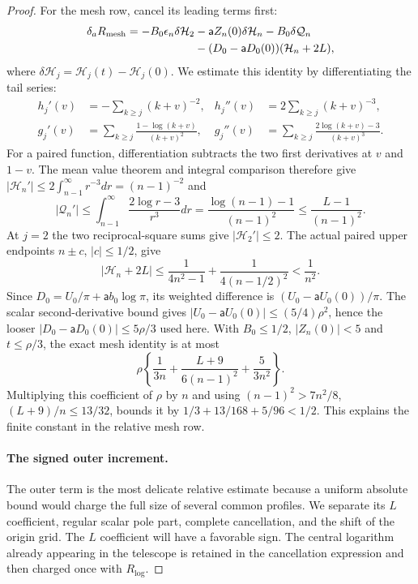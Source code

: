 \begin{proof}
For the mesh row, cancel its leading terms first:
\[
 \begin{aligned}
 \delta_aR_{\rm mesh}=-B_0\epsilon_n\delta\mathcal H_2
 &-\mathsf{a}Z_n(0)\delta\mathcal H_n-B_0\delta\mathcal Q_n\\
 &-(D_0-\mathsf{a}D_0(0))(\mathcal H_n+2L),
 \end{aligned}
\]
where $\delta\mathcal H_j=\mathcal H_j(t)-\mathcal H_j(0)$.
We estimate this identity by differentiating the tail series:
\[
 \begin{aligned}
 h_j'(v)&=-\sum_{k\geq j}(k+v)^{-2},&
 h_j''(v)&=2\sum_{k\geq j}(k+v)^{-3},\\
 g_j'(v)&=\sum_{k\geq j}\frac{1-\log(k+v)}{(k+v)^2},&
 g_j''(v)&=\sum_{k\geq j}\frac{2\log(k+v)-3}{(k+v)^3}.
 \end{aligned}
\]
For a paired function, differentiation subtracts the two first
derivatives at $v$ and $1-v$. The mean value theorem and integral
comparison therefore give
$|\mathcal H_n'|\leq2\int_{n-1}^\infty r^{-3}dr=(n-1)^{-2}$ and
\[
 |\mathcal Q_n'|\leq\int_{n-1}^\infty
                     \frac{2\log r-3}{r^3}dr
 =\frac{\log(n-1)-1}{(n-1)^2}\leq\frac{L-1}{(n-1)^2}.
\]
At $j=2$ the two reciprocal-square sums give
$|\mathcal H_2'|\leq2$. The actual paired upper endpoints
$n\pm c$, $|c|\leq1/2$, give
\[
 |\mathcal H_n+2L|\leq\frac1{4n^2-1}
                  +\frac1{4(n-1/2)^2}<\frac1{n^2}.
\]
Since $D_0=U_0/\pi+\mathsf a b_0\log\pi$, its weighted
difference is $(U_0-\mathsf aU_0(0))/\pi$. The scalar second-derivative
bound gives $|U_0-\mathsf aU_0(0)|\leq(5/4)\rho^2$, hence the
looser $|D_0-\mathsf aD_0(0)|\leq5\rho/3$ used here.
With $B_0\leq1/2$, $|Z_n(0)|<5$ and $t\leq\rho/3$, the exact
mesh identity is at most
\[
 \rho\left\{\frac1{3n}+\frac{L+9}{6(n-1)^2}
                              +\frac5{3n^2}\right\}.
\]
Multiplying this coefficient of $\rho$ by $n$
and using $(n-1)^2>7n^2/8$, $(L+9)/n\leq13/32$, bounds it by
$1/3+13/168+5/96<1/2$. This explains the finite constant in the
relative mesh row.

\paragraph{The signed outer increment.}
The outer term is the most delicate relative estimate because a
uniform absolute bound would charge the full size of several common
profiles. We separate its $L$ coefficient, regular scalar pole part,
complete cancellation, and the shift of the origin grid. The $L$
coefficient will have a favorable sign. The central logarithm already
appearing in the telescope is retained in the cancellation expression
and then charged once with $R_{\log}$.


\end{proof}
